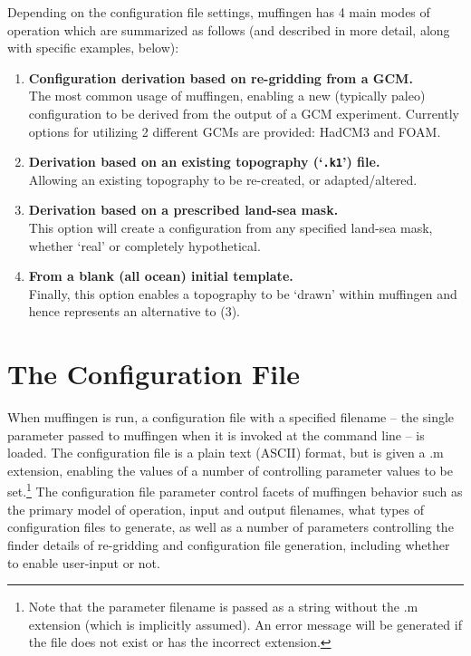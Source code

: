 \documentclass[11pt,fleqn]{book} %
\begin{document}
Depending on the configuration file settings, muffingen has 4 main modes of operation which are summarized as follows (and described in more detail, along with specific examples, below):

\begin{enumerate}[noitemsep]
\setlength{\itemindent}{.2in}
\setcounter{enumi}{0}
\item \textbf{Configuration derivation based on re-gridding from a GCM.}
\\ The most common usage of muffingen, enabling a new (typically paleo) configuration to be derived from the output of a GCM experiment. Currently options for utilizing 2 different GCMs are provided: HadCM3 and FOAM.
\item \textbf{Derivation based on an existing topography (`\texttt{.k1}') file.}
\\ Allowing an existing topography to be re-created, or adapted/altered. 
\item \textbf{Derivation based on a prescribed land-sea mask.}
\\ This option will create a configuration from any specified land-sea mask, whether `real' or completely hypothetical. 
\item \textbf{From a blank (all ocean) initial template.}
\\ Finally, this option enables a topography to be `drawn' within muffingen and hence represents an alternative to (3).
\end{enumerate} 


\section{The Configuration File}

When muffingen is run, a configuration file with a specified filename -- the single parameter passed to muffingen when it is invoked at the command line -- is loaded. The configuration file is a plain text (ASCII) format, but is given a .m extension, enabling the values of a number of controlling parameter values to be set.\footnote{Note that the parameter filename is passed as a string without the .m extension (which is implicitly assumed). An error message will be generated if the file does not exist or has the incorrect extension.} The configuration file parameter control facets of muffingen behavior such as the primary model of operation, input and output filenames, what types of configuration files to generate, as well as a number of parameters controlling the finder details of re-gridding and configuration file generation, including whether to enable user-input or not.
\end{document}
